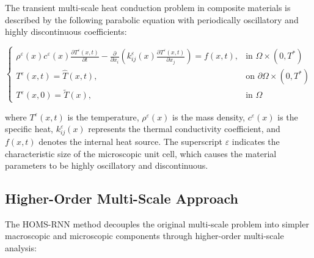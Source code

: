 \documentclass[11pt]{article}
\begin{document}
The transient multi-scale heat conduction problem in composite materials is described by the following parabolic equation with periodically oscillatory and highly discontinuous coefficients:

\begin{equation}
\begin{cases}
\rho^{\varepsilon}(x)c^{\varepsilon}(x)\frac{\partial T^{\varepsilon}(x,t)}{\partial t}-\frac{\partial}{\partial x_i}\left(k^{\varepsilon}_{ij}(x)\frac{\partial T^{\varepsilon}(x,t)}{\partial x_j}\right) = f(x,t), & \text{in } \Omega \times (0,T^*) \\
T^{\varepsilon}(x,t) = \hat{T}(x,t), & \text{on } \partial\Omega \times (0,T^*) \\
T^{\varepsilon}(x,0) = \tilde{T}(x), & \text{in } \Omega
\end{cases}
\end{equation}

where $T^{\varepsilon}(x,t)$ is the temperature, $\rho^{\varepsilon}(x)$ is the mass density, $c^{\varepsilon}(x)$ is the specific heat, $k^{\varepsilon}_{ij}(x)$ represents the thermal conductivity coefficient, and $f(x,t)$ denotes the internal heat source. The superscript $\varepsilon$ indicates the characteristic size of the microscopic unit cell, which causes the material parameters to be highly oscillatory and discontinuous.

\subsection{Higher-Order Multi-Scale Approach}

The HOMS-RNN method decouples the original multi-scale problem into simpler macroscopic and microscopic components through higher-order multi-scale analysis:
\end{document}

